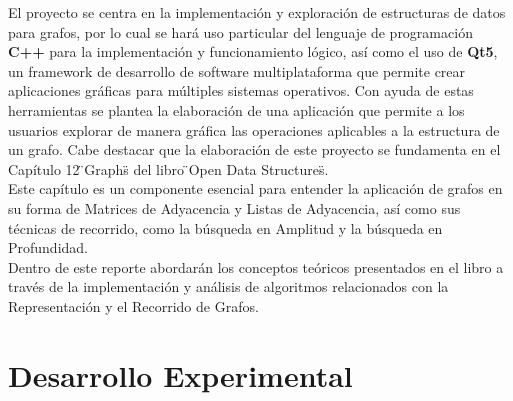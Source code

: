 \documentclass[conference]{IEEEtran}
\begin{document}
\begin{center}
\end{center}

El proyecto se centra en la implementación y exploración de estructuras de datos para grafos, por lo cual se hará uso particular del lenguaje de programación \textbf{C++} para la implementación y funcionamiento lógico, así como el uso de \textbf{Qt5}, un framework de desarrollo de software multiplataforma que permite crear aplicaciones gráficas para múltiples sistemas operativos. Con ayuda de estas herramientas se plantea la elaboración de una aplicación que permite a los usuarios explorar de manera gráfica las operaciones aplicables a la estructura de un grafo. Cabe destacar que la elaboración de este proyecto se fundamenta en el Capítulo 12 \"{}Graphs\"{} del libro \"{}Open Data Structures\"{}.\cite{ODS} \\
Este capítulo es un componente esencial para entender la aplicación de grafos en su forma de Matrices de Adyacencia y Listas de Adyacencia, así como sus técnicas de recorrido, como la búsqueda en Amplitud y la búsqueda en Profundidad.\\

Dentro de este reporte abordarán los conceptos teóricos presentados en el libro a través de la implementación y análisis de algoritmos relacionados con la Representación y el Recorrido de Grafos.

 
\section{Desarrollo Experimental}
\end{document}
